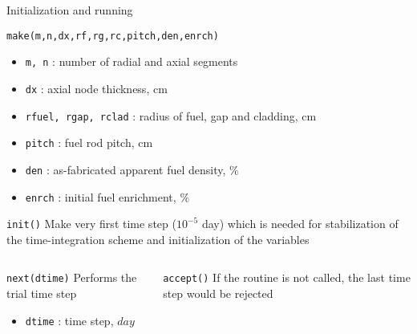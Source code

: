 \documentclass[11pt]{beamer}
\begin{document}
\begin{frame}{Initialization and running}
  
  \footnotesize

  \begin{block}{\texttt{make(m,n,dx,rf,rg,rc,pitch,den,enrch)}}
    \begin{itemize}
    \item \texttt{m, n} : number of radial and axial segments
    \item \texttt{dx} : axial node thickness, cm
    \item \texttt{rfuel, rgap, rclad} : radius of fuel, gap and cladding, cm
    \item \texttt{pitch} : fuel rod pitch, cm
    \item \texttt{den} : as-fabricated apparent fuel density, $\%$
    \item \texttt{enrch} : initial fuel enrichment, $\%$
    \end{itemize}
  \end{block}

  \begin{block}{\texttt{init()}}
  Make very first time step ($10^{-5}$ day) which is needed for stabilization of the time-integration scheme and initialization of the variables
  \end{block}
  
  \begin{columns}

  \begin{block}{\texttt{next(dtime)}}
    Performs the trial time step
    \begin{itemize}
    \item \texttt{dtime} : time step, $day$
    \end{itemize}
  \end{block}
  
  \begin{block}{\texttt{accept()}}
  If the routine is not called, the last time step would be rejected
  \end{block}

  \end{columns}
  
\end{frame}
\end{document}
